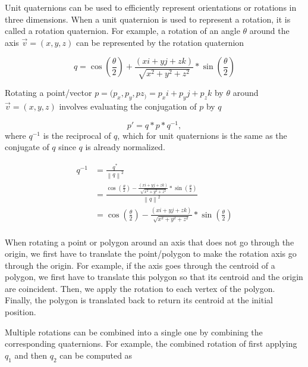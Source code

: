Unit quaternions can be used to efficiently represent orientations or rotations in three dimensions. When a unit quaternion is used to represent a rotation, it is called a rotation quaternion. For example, a rotation of an angle \( \theta \) around the axis \( \vec{v} = (x, y, z) \) can be represented by the rotation quaternion

\begin{equation}
    q = \cos(\frac{\theta}{2}) + \frac{(xi + yj + zk)}{\sqrt{x^2 + y^2 + z^2}}*\sin(\frac{\theta}{2})
\end{equation}

Rotating a point/vector \( p = (p_x, p_y, pz_) = p_xi + p_yj + p_zk \) by \( \theta \) around \( \vec{v} = (x, y, z) \) involves evaluating the conjugation of \( p \) by \( q \) 

\begin{equation}
    p' = q*p*q^{-1}, 
\end{equation}
where \( q^{-1} \) is the reciprocal of \( q \), which for unit quaternions is the same as the conjugate of \( q \) since \( q \) is already normalized.

\begin{equation}
\begin{split}
    q^{-1} & = \frac{q^{\ast}}{{\left \| q \right \|}^2} \\
            & = \frac{\cos(\frac{\theta}{2}) - \frac{(xi + yj + zk)}{\sqrt{x^2 + y^2 + z^2}}*\sin(\frac{\theta}{2})}{{\left \| q \right \|}^2} \\
            & = \cos(\frac{\theta}{2}) - \frac{(xi + yj + zk)}{\sqrt{x^2 + y^2 + z^2}}*\sin(\frac{\theta}{2}) \\
\end{split}
\end{equation}

When rotating a point or polygon around an axis that does not go through the origin, we first have to translate the point/polygon to make the rotation axis go through the origin. For example, if the axis goes through the centroid of a polygon, we first have to translate this polygon so that its centroid and the origin are coincident. Then, we apply the rotation to each vertex of the polygon. Finally, the polygon is translated back to return its centroid at the initial position.

Multiple rotations can be combined into a single one by combining the corresponding quaternions. For example, the combined rotation of first applying \( q_1 \) and then \( q_2 \) can be computed as 

